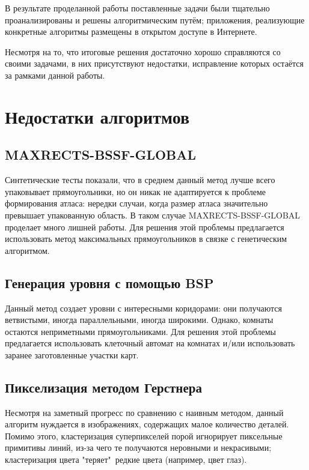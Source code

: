 \documentclass[a4paper,12pt]{report}
\begin{document}
\parindent=1cm
В результате проделанной работы поставленные задачи были тщательно проанализированы и решены алгоритмическим путём; приложения, реализующие конкретные алгоритмы размещены в открытом доступе в Интернете.

Несмотря на то, что итоговые решения достаточно хорошо справляются со своими задачами, в них присутствуют недостатки, исправление которых остаётся за рамками данной работы.

\section{Недостатки алгоритмов}
\subsection{MAXRECTS-BSSF-GLOBAL}
Синтетические тесты показали, что в среднем данный метод лучше всего упаковывает прямоугольники, но он никак не адаптируется к проблеме формирования атласа: нередки случаи, когда размер атласа значительно превышает упакованную область. В таком случае MAXRECTS-BSSF-GLOBAL проделает много лишней работы. Для решения этой проблемы предлагается использовать метод максимальных прямоугольников в связке с генетическим алгоритмом.

\subsection{Генерация уровня с помощью BSP}
Данный метод создает уровни с интересными коридорами: они получаются ветвистыми, иногда параллельными, иногда широкими. Однако, комнаты остаются неприметными прямоугольниками. Для решения этой проблемы предлагается использовать клеточный автомат на комнатах и/или использовать заранее заготовленные участки карт.

\subsection{Пикселизация методом Герстнера}
Несмотря на заметный прогресс по сравнению с наивным методом, данный алгоритм нуждается в изображениях, содержащих малое количество деталей. Помимо этого, кластеризация суперпикселей порой игнорирует пиксельные примитивы линий, из-за чего те получаются неровными и некрасивыми; кластеризация цвета "теряет"\ редкие цвета (например, цвет глаз). 



\end{document}
